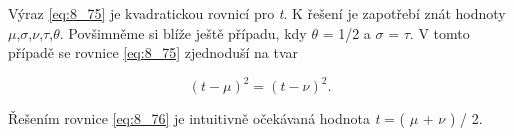 Výraz \eqref{eq:8_75} je kvadratickou rovnicí pro \textit{t}. K řešení je zapotřebí znát hodnoty $\mu$,$\sigma$,$\nu$,$\tau$,$\theta$. Povšimněme si blíže ještě případu, kdy  $\theta$ = 1/2  a  $\sigma$ = $\tau$. V tomto případě se rovnice \eqref{eq:8_75} zjednoduší na tvar

\begin{equation} \label{eq:8_76}
    (t - \mu)^2 = (t - \nu)^2.
\end{equation}

Řešením rovnice \eqref{eq:8_76} je intuitivně očekávaná hodnota \textit{t} = ( $\mu$ + $\nu$ ) / 2.






